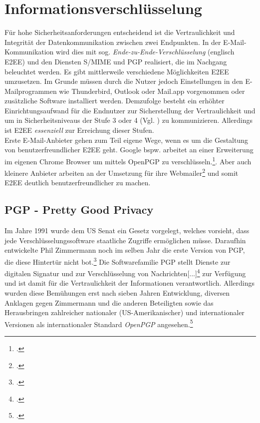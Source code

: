 \documentclass  [paper=a4,
				fontsize=12pt,
				listof=totoc,
				bibliography=totoc
				]{scrreprt}
\begin{document}
		\section{Informationsverschlüsselung}
			Für hohe Sicherheitsanforderungen entscheidend ist die Vertraulichkeit und Integrität der Datenkommunikation zwischen zwei Endpunkten. In der E-Mail-Kommunikation wird dies mit sog. \textit{Ende-zu-Ende-Verschlüsselung} (englisch \ac{E2EE}) und den Diensten \ac{S/MIME} und \ac{PGP} realisiert, die im Nachgang beleuchtet werden.
			Es gibt mittlerweile verschiedene Möglichkeiten \ac{E2EE} umzusetzen. Im Grunde müssen durch die Nutzer jedoch Einstellungen in den E-Mailprogrammen wie Thunderbird, Outlook oder Mail.app vorgenommen oder zusätzliche Software installiert werden. Demzufolge besteht ein erhöhter Einrichtungsaufwand für die Endnutzer zur Sicherstellung der Vertraulichkeit und um in Sicherheitsniveaus der Stufe 3 oder 4 (Vgl. ) zu kommunizieren. Allerdings ist \ac{E2EE} \textit{essenziell} zur Erreichung dieser Stufen.\medskip\\
			Erste E-Mail-Anbieter gehen zum Teil eigene Wege, wenn es um die Gestaltung von benutzerfreundlicher \ac{E2EE} geht. Google bspw. arbeitet an einer Erweiterung im eigenen Chrome Browser um mittels OpenPGP zu verschlüsseln.\footcite[Vgl.][]{Somogyi2013}. Aber auch kleinere Anbieter arbeiten an der Umsetzung für ihre Webmailer\footcite[Vgl.][]{Posteo2013} und somit \ac{E2EE} deutlich benutzerfreundlicher zu machen. 
			
			\subsection{PGP - Pretty Good Privacy}
			\label{subsec:pgp}
				Im Jahre 1991 wurde dem US Senat ein Gesetz vorgelegt, welches vorsieht, dass jede Verschlüsselungssoftware staatliche Zugriffe ermöglichen müsse. Daraufhin entwickelte Phil Zimmermann noch im selben Jahr die erste Version von \ac{PGP}, die diese Hintertür nicht bot.\footcite[vgl.][S. 29]{Schwenk}\newpage
				Die Softwarefamilie \acl{PGP} stellt \glqq[...]Dienste zur digitalen Signatur und zur Verschlüsselung von Nachrichten[...]\grqq\footcite{Mueller2011} zur Verfügung und ist damit für die Vertraulichkeit der Informationen verantwortlich.				
				Allerdings wurden diese Bemühungen erst nach sieben Jahren Entwicklung, diversen Anklagen gegen Zimmermann und die anderen Beteiligten sowie das Herausbringen zahlreicher nationaler (US-Amerikanischer) und internationaler Versionen als internationaler Standard \textit{OpenPGP} angesehen.\footcite[][S. 29-35]{Schwenk}
				\medskip
				
\end{document}
